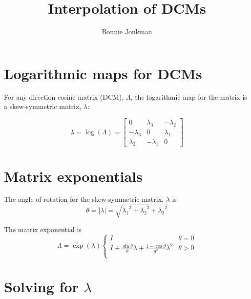 \documentclass[10pt,letterpaper,oneside,notitlepage]{article}
\begin{document}
\title{Interpolation of DCMs}
\author{Bonnie Jonkman}
\maketitle


\section{Logarithmic maps for DCMs}

For any direction cosine matrix (DCM), $\Lambda$, 
the logarithmic map for the matrix is a skew-symmetric matrix, $\lambda$:


\begin{equation}
\label{EqLog}
\lambda 
= \log( \Lambda )
= \begin{bmatrix}
		0          &  \lambda_3 & -\lambda_2 \\
		-\lambda_3 &  0         &  \lambda_1 \\	
		 \lambda_2 & -\lambda_1 &  0          
	\end{bmatrix}
\end{equation}

\section{Matrix exponentials}

The angle of rotation for the skew-symmetric matrix, $\lambda$ is
\begin{equation}
\label{EqRotationAng}
\theta = \left|\lambda\right| = \sqrt{{\lambda_1}^2+{\lambda_2}^2+{\lambda_3}^2} 
\end{equation}

The matrix exponential is 
\begin{equation}
\label{EqExp}
 \Lambda = \exp(\lambda) 
 \left\{ 
 \begin{matrix}
	I                                                                              &  \theta = 0 \\
	I + \frac{\sin\theta}{\theta}\lambda + \frac{1-\cos\theta}{\theta^2}\lambda^2  &  \theta > 0 \\
 \end{matrix} 
 \right.
\end{equation}


\section{Solving for $\lambda$}
\end{document}
